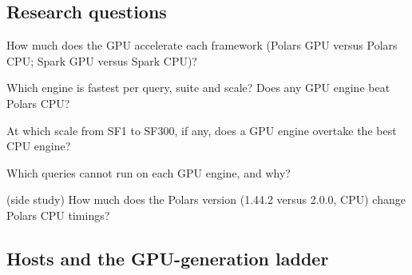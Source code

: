 \documentclass[11pt]{article}
\begin{document}
\subsection{Research questions}
\label{sec:rqs}
\begin{description}[leftmargin=*,itemsep=2pt]
  \item[RQ1] How much does the GPU accelerate each framework (Polars GPU versus
    Polars CPU; Spark GPU versus Spark CPU)?
  \item[RQ2] Which engine is fastest per query, suite and scale? Does any GPU
    engine beat Polars CPU?
  \item[RQ3] At which scale from SF1 to SF300, if any, does a GPU engine
    overtake the best CPU engine?
  \item[RQ4] Which queries cannot run on each GPU engine, and why?
  \item[RQ5] (side study) How much does the Polars version (1.44.2 versus
    2.0.0, CPU) change Polars CPU timings?
\end{description}

\subsection{Hosts and the GPU-generation ladder}
\label{sec:hosts}
\end{document}
